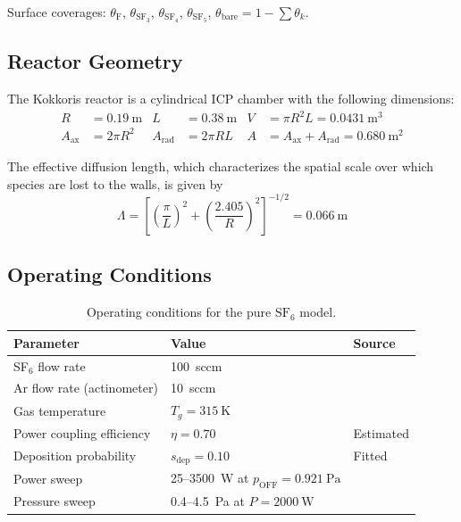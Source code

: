 \documentclass[11pt,a4paper]{report}
\newcommand{\SFsix}{\mathrm{SF}_6}
\begin{document}
Surface coverages: $\theta_\text{F}$, $\theta_{\text{SF}_3}$, $\theta_{\text{SF}_4}$, $\theta_{\text{SF}_5}$, $\theta_\text{bare} = 1 - \sum\theta_k$.

\subsection{Reactor Geometry}
\label{sec:pure_geometry}

The Kokkoris reactor is a cylindrical ICP chamber with the following dimensions:
\begin{align}
R &= \SI{0.19}{\meter} & L &= \SI{0.38}{\meter} & V &= \pi R^2 L = \SI{0.0431}{\meter^3} \\
A_\text{ax} &= 2\pi R^2 & A_\text{rad} &= 2\pi RL & A &= A_\text{ax}+A_\text{rad} = \SI{0.680}{\meter^2}
\end{align}

The effective diffusion length, which characterizes the spatial scale over which species are lost to the walls, is given by
\begin{equation}
\Lambda = \left[\left(\frac{\pi}{L}\right)^2 + \left(\frac{2.405}{R}\right)^2\right]^{-1/2} = \SI{0.066}{\meter}
\label{eq:pure_Lambda}
\end{equation}

\subsection{Operating Conditions}
\label{sec:pure_conditions}

\begin{table}[H]
\centering
\caption{Operating conditions for the pure $\SFsix$ model.}
\label{tab:pure_conditions}
\begin{tabular}{lll}
\toprule
\textbf{Parameter} & \textbf{Value} & \textbf{Source} \\
\midrule
SF$_6$ flow rate & \SI{100}{sccm} & \cite{Kokkoris2009} \\
Ar flow rate (actinometer) & \SI{10}{sccm} & \cite{Kokkoris2009} \\
Gas temperature & $T_g = \SI{315}{\kelvin}$ & \cite{Kokkoris2009} \\
Power coupling efficiency & $\eta = 0.70$ & Estimated \\
Deposition probability & $s_\text{dep} = 0.10$ & Fitted \\
Power sweep & 25--\SI{3500}{\watt} at $p_\text{OFF} = \SI{0.921}{\pascal}$ & \cite{Kokkoris2009} \\
Pressure sweep & 0.4--\SI{4.5}{\pascal} at $P = \SI{2000}{\watt}$ & \cite{Kokkoris2009} \\
\bottomrule
\end{tabular}
\end{table}
\end{document}
